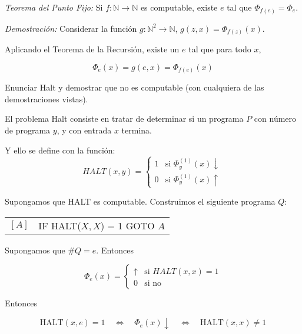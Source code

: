 \begin{questions}

\begin{solution}

 {\it Teorema del Punto Fijo: } Si $f : \mathbb{N}\rightarrow\mathbb{N}$ es computable, existe $e$ tal que $\Phi_{f(e)}=\Phi_e$.
 
 {\it Demostraci\'on: } Considerar la funci\'on $g : \mathbb{N}^2\rightarrow\mathbb{N}$, $g(z,x) = \Phi_{f(z)}(x)$.
 
 Aplicando el Teorema de la Recursi\'on, existe un $e$ tal que para todo $x$, 
 
 \begin{equation*}
  \Phi_e(x)=g(e,x)=\Phi_{f(e)}(x)
 \end{equation*}

\end{solution}

\question Enunciar Halt y demostrar que no es computable (con cualquiera de las demostraciones vistas).


\begin{solution}

El problema Halt consiste en tratar de determinar si un programa $P$ con n\'umero de programa $y$, y con entrada $x$ termina. 

Y ello se define con la funci\'on: 
$$
HALT(x,y) = \left\{
\begin{array}{cl}
1 & \mbox{si } \Phi_y^{(1)}(x)\downarrow \\
0 & \mbox{si } \Phi_y^{(1)}(x)\uparrow
\end{array}\right.
$$

Supongamos que HALT es computable. Construimos el siguiente programa $Q$: 

\begin{tabular}{rl}
  $[A]$ & IF HALT($X,X$) = 1 GOTO $A$ 
\end{tabular}

Supongamos que $\#Q=e$. Entonces

$$
\Phi_e(x) = \left\{
\begin{array}{cl}
\uparrow & \mbox{si } HALT(x,x)=1 \\
0 & \mbox{si no} 
\end{array}\right.
$$

Entonces

$$
\text{HALT}(x,e)=1 \quad\Leftrightarrow\quad \Phi_e(x)\downarrow \quad\Leftrightarrow\quad \text{HALT}(x,x)\neq 1
$$


\end{solution}
\end{questions}
